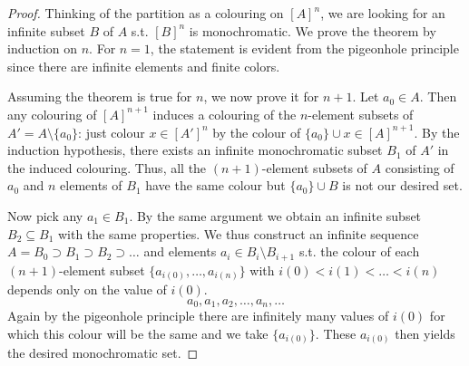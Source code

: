 \documentclass[11pt]{article}
\begin{document}
\begin{proof}
Thinking of the partition as a colouring on \([A]^n\), we are looking for an infinite
subset \(B\) of \(A\) s.t. \([B]^n\) is monochromatic. We prove the theorem by induction
on \(n\). For \(n=1\), the statement is evident from the pigeonhole principle since there are
infinite elements and finite colors.

Assuming the theorem is true for \(n\), we now prove it for \(n+1\). Let \(a_0\in A\). Then any
colouring of \([A]^{n+1}\) induces a colouring of the \(n\)-element subsets of \(A'=A\setminus\{a_0\}\):
just colour \(x\in[A']^n\) by the colour of \(\{a_0\}\cup x\in[A]^{n+1}\). By the induction hypothesis,
there exists an infinite monochromatic subset \(B_1\) of \(A'\) in the induced colouring. Thus,
all the \((n+1)\)-element subsets of \(A\) consisting of \(a_0\) and \(n\) elements of \(B_1\)
have the same colour but \(\{a_0\}\cup B\) is not our desired set.

Now pick any \(a_1\in B_1\). By the same argument we obtain an infinite
subset \(B_2\subseteq B_1\) with the same properties. We thus construct an infinite
sequence \(A=B_0\supset B_1\supset B_2\supset\dots\) and elements \(a_i\in B_i\setminus B_{i+1}\) s.t.
the colour of each \((n+1)\)-element subset \(\{a_{i(0)},\dots,a_{i(n)}\}\) with \(i(0)<i(1)<\dots<i(n)\)
depends only on the value of \(i(0)\).
\begin{equation*}
a_0,a_1,a_2,\dots,a_n,\dots
\end{equation*}
Again by the pigeonhole principle there are infinitely
many values of \(i(0)\) for which this colour will be the same and we take \(\{a_{i(0)}\}\).
These \(a_{i(0)}\) then yields
the desired monochromatic set.
\end{proof}
\end{document}
